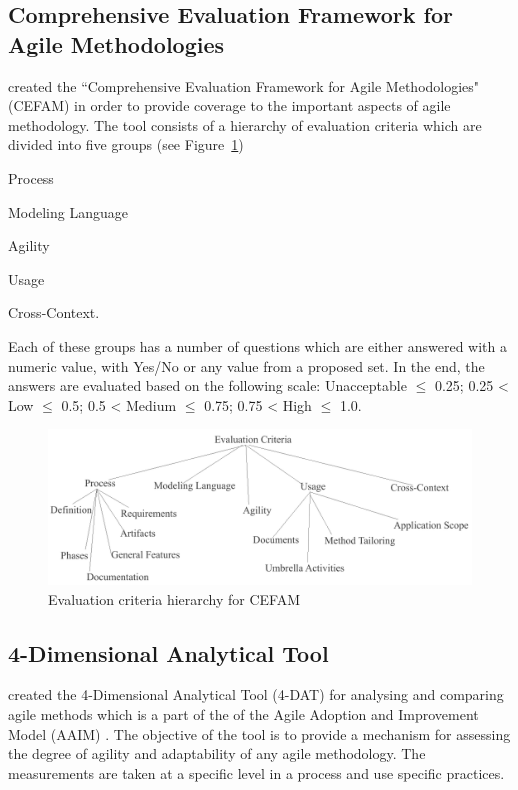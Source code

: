 \subsection{Comprehensive Evaluation Framework for Agile Methodologies}
\citet{cefam} created the ``Comprehensive Evaluation Framework for Agile Methodologies" (CEFAM) in order to provide coverage to the important aspects of agile methodology. The tool consists of a hierarchy of evaluation criteria which are divided into five groups (see Figure~\ref{cefam})
\begin{inparaenum} [a\upshape)]
\item Process
\item Modeling Language
\item Agility
\item Usage
\item Cross-Context.
\end{inparaenum}
Each of these groups has a number of questions which are either answered with a numeric value, with Yes/No or any value from a proposed set. In the end, the answers are evaluated based on the following scale: Unacceptable $\leq$ 0.25; 0.25 < Low $\leq$ 0.5; 0.5 < Medium $\leq$ 0.75; 0.75 < High $\leq$ 1.0.

\begin{figure} [H]
\centerline{\includegraphics[scale=0.75]{include/relatedwork/fig/cefam.pdf}}
\caption{Evaluation criteria hierarchy for CEFAM} 
\label{cefam}
\end{figure}

\subsection{4-Dimensional Analytical Tool} %
\citet{qumer2006measuring} created the 4-Dimensional Analytical Tool (4-DAT) for analysing and comparing agile methods which is a part of the of the Agile Adoption and Improvement Model (AAIM) \cite{qumerAAIM}. The objective of the tool is to provide a mechanism for assessing the degree of agility and adaptability of any agile methodology. The measurements are taken at a specific level in a process and use specific practices.

